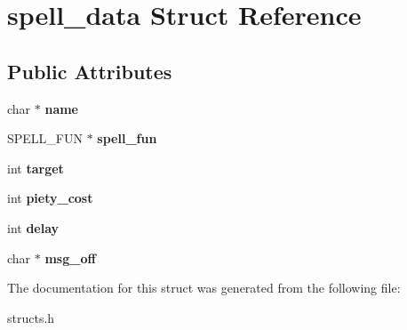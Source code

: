\hypertarget{structspell__data}{\section{spell\-\_\-data Struct Reference}
\label{structspell__data}
}
\subsection*{Public Attributes}
\begin{DoxyCompactItemize}
\item 
\hypertarget{structspell__data_a89508e1eae34147448b293496e95ccfc}{char $\ast$ {\bfseries name}}\label{structspell__data_a89508e1eae34147448b293496e95ccfc}

\item 
\hypertarget{structspell__data_a330ef35c27c31ce4676ff7cb93cdaa64}{S\-P\-E\-L\-L\-\_\-\-F\-U\-N $\ast$ {\bfseries spell\-\_\-fun}}\label{structspell__data_a330ef35c27c31ce4676ff7cb93cdaa64}

\item 
\hypertarget{structspell__data_ac2e0d321db318e6290cb85aef4074918}{int {\bfseries target}}\label{structspell__data_ac2e0d321db318e6290cb85aef4074918}

\item 
\hypertarget{structspell__data_a97c8e1276ff4e5b1b07f2766c619c7dd}{int {\bfseries piety\-\_\-cost}}\label{structspell__data_a97c8e1276ff4e5b1b07f2766c619c7dd}

\item 
\hypertarget{structspell__data_a7223664497a8ecd687bc91b6d5d1f226}{int {\bfseries delay}}\label{structspell__data_a7223664497a8ecd687bc91b6d5d1f226}

\item 
\hypertarget{structspell__data_a0f91bd1c3c4a450403d23be5c00a0b71}{char $\ast$ {\bfseries msg\-\_\-off}}\label{structspell__data_a0f91bd1c3c4a450403d23be5c00a0b71}

\end{DoxyCompactItemize}


The documentation for this struct was generated from the following file\-:\begin{DoxyCompactItemize}
\item 
structs.\-h\end{DoxyCompactItemize}
